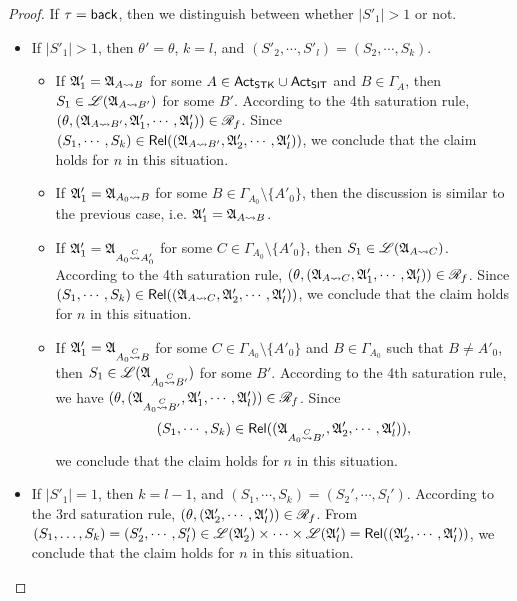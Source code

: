 \begin{proof}
If $\tau = {\mathsf{back} }$, then we distinguish between whether $|S'_1| > 1$ or not. 
\begin{itemize}
\item If $|S'_1| > 1$, then $\theta' = \theta$, $k=l$, and $(S'_2, \cdots, S'_l) = (S_2, \cdots, S_k)$. 
\begin{itemize}
\item If ${\mathfrak{A} }'_1 = {\mathfrak{A} }_{A \rightsquigarrow B}$  for some $A \in {\sf Act}_{\sf STK} \cup {\sf Act}_{\sf SIT}$ and $B \in \Gamma_A$, then $S_1 \in {\mathscr{L} }({\mathfrak{A} }_{A \rightsquigarrow B'})$ for some $B'$.  According to the 4th saturation rule, $(\theta, ({\mathfrak{A} }_{A \rightsquigarrow B'}, {\mathfrak{A} }'_1, \cdots, {\mathfrak{A} }'_l)) \in \mathscr{R}_f$. Since $(S_1, \cdots, S_k) \in \mathsf{Rel}(({\mathfrak{A} }_{A \rightsquigarrow B'}, {\mathfrak{A} }'_2, \cdots, {\mathfrak{A} }'_l))$, we conclude that the claim holds for $n$ in this situation. 
%
\item If ${\mathfrak{A} }'_1 = {\mathfrak{A} }_{A_0 \rightsquigarrow B}$  for some $B \in \Gamma_{A_0} \setminus \{A'_0\}$, then the discussion is similar to the previous case, i.e. ${\mathfrak{A} }'_1 = {\mathfrak{A} }_{A \rightsquigarrow B}$. 
%
\item If ${\mathfrak{A} }'_1 = {\mathfrak{A} }_{A_0 \stackrel{C}{\rightsquigarrow} A'_0}$ for some $C \in \Gamma_{A_0} \setminus \{A'_0\}$, then $S_1 \in {\mathscr{L} }({\mathfrak{A} }_{A \rightsquigarrow C})$. According to the 4th saturation rule, $(\theta, ({\mathfrak{A} }_{A \rightsquigarrow C}, {\mathfrak{A} }'_1, \cdots, {\mathfrak{A} }'_l)) \in \mathscr{R}_f$. Since $(S_1, \cdots, S_k) \in \mathsf{Rel}(({\mathfrak{A} }_{A \rightsquigarrow C}, {\mathfrak{A} }'_2, \cdots, {\mathfrak{A} }'_l))$, we conclude that the claim holds for $n$ in this situation. 
%
\item If ${\mathfrak{A} }'_1 = {\mathfrak{A} }_{A_0 \stackrel{C}{\rightsquigarrow} B}$ for some $C \in \Gamma_{A_0} \setminus \{A'_0\}$ and $B \in \Gamma_{A_0}$ such that $B \neq A'_0$, then $S_1 \in {\mathscr{L} }({\mathfrak{A} }_{A_0 \stackrel{C}{\rightsquigarrow} B'})$ for some $B'$. According to the 4th saturation rule, we have $(\theta, ({\mathfrak{A} }_{A_0 \stackrel{C}{\rightsquigarrow} B'}, {\mathfrak{A} }'_1, \cdots, {\mathfrak{A} }'_l)) \in \mathscr{R}_f$. Since 
%
$$(S_1, \cdots, S_k) \in \mathsf{Rel}(({\mathfrak{A} }_{A_0 \stackrel{C}{\rightsquigarrow} B'}, {\mathfrak{A} }'_2, \cdots, {\mathfrak{A} }'_l)),$$ 
%
we conclude that the claim holds for $n$ in this situation. 
%
\end{itemize}
%
\item If $|S'_1| = 1$, then $k = l - 1$, and $(S_1,\cdots,S_k) = (S_2',\cdots,S_l')$. According to the 3rd saturation rule, $(\theta, ({\mathfrak{A} }_2',\cdots,{\mathfrak{A} }_l')) \in \mathscr{R}_f$. From $(S_1,\dots,S_k) = (S'_2, \cdots, S'_l) \in {\mathscr{L} }({\mathfrak{A} }_2') \times \cdots \times {\mathscr{L} }({\mathfrak{A} }_l') = \mathsf{Rel}(({\mathfrak{A} }'_2, \cdots, {\mathfrak{A} }'_l))$, we conclude that the claim holds for $n$ in this situation. 
\end{itemize}



\end{proof}

